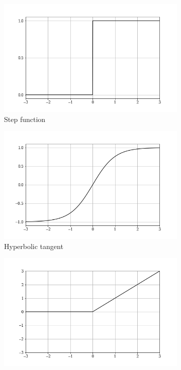 \begin{figure}[h]
\begin{subfigure}{.5\textwidth}
  \centering
  \includegraphics[width=\linewidth]{images/Chapter2/step (1).png}
  \caption{Step function}
  \label{fig:step_f}
\end{subfigure}%
\begin{subfigure}{.5\textwidth}
  \centering
  \includegraphics[width=\linewidth]{images/Chapter2/tanh (1).png}
  \caption{Hyperbolic tangent}
  \label{fig:hyptg}
\end{subfigure}
\begin{subfigure}{.5\textwidth}
  \centering
  \includegraphics[width=\linewidth]{images/Chapter2/ReLU (1).png}

\end{subfigure}
\end{figure}
